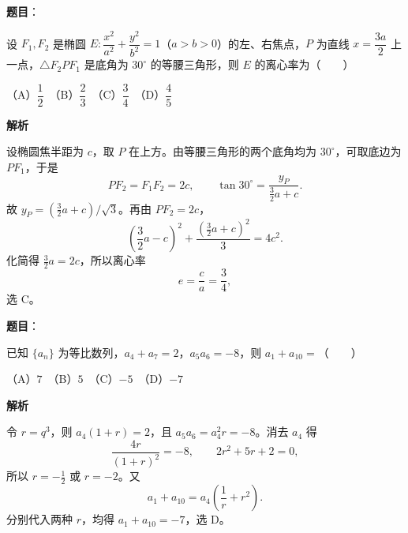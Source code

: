 \begin{answer}

\textbf{题目}：

设 $F_1,F_2$ 是椭圆 $E:\dfrac{x^2}{a^2}+\dfrac{y^2}{b^2}=1$（$a>b>0$）的左、右焦点，$P$ 为直线 $x=\dfrac{3a}{2}$ 上一点，$\triangle F_2PF_1$ 是底角为 $30^\circ$ 的等腰三角形，则 $E$ 的离心率为\mbox{（　　）}

（A）$\dfrac12$　（B）$\dfrac23$　（C）$\dfrac34$　（D）$\dfrac45$

\textbf{解析}

设椭圆焦半距为 $c$，取 $P$ 在上方。由等腰三角形的两个底角均为 $30^\circ$，可取底边为 $PF_1$，于是
\nopagebreak[4]
\[
PF_2=F_1F_2=2c,\qquad
\tan30^\circ=\frac{y_P}{\frac32a+c}.
\]
故 $y_P=(\frac32a+c)/\sqrt3$。再由 $PF_2=2c$，
\nopagebreak[4]
\[
\left(\frac32a-c\right)^2+\frac{(\frac32a+c)^2}{3}=4c^2.
\]
化简得 $\frac32a=2c$，所以离心率
\nopagebreak[4]
\[
e=\frac ca=\frac34,
\]
选 C。


\end{answer}
\begin{answer}

\textbf{题目}：

已知 $\{a_n\}$ 为等比数列，$a_4+a_7=2$，$a_5a_6=-8$，则 $a_1+a_{10}=$\mbox{（　　）}

（A）$7$　（B）$5$　（C）$-5$　（D）$-7$

\textbf{解析}

令 $r=q^3$，则 $a_4(1+r)=2$，且 $a_5a_6=a_4^2r=-8$。消去 $a_4$ 得
\nopagebreak[4]
\[
\frac{4r}{(1+r)^2}=-8,\qquad
2r^2+5r+2=0,
\]
所以 $r=-\frac12$ 或 $r=-2$。又
\nopagebreak[4]
\[
a_1+a_{10}=a_4\left(\frac1r+r^2\right).
\]
分别代入两种 $r$，均得 $a_1+a_{10}=-7$，选 D。


\end{answer}
